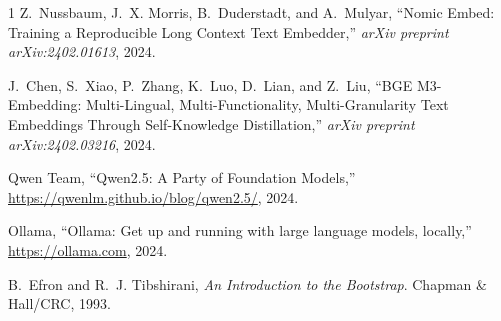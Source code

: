 \documentclass[journal]{IEEEtran}
\begin{document}
\begin{thebibliography}{1}
Z.~Nussbaum, J.~X. Morris, B.~Duderstadt, and A.~Mulyar,
``Nomic Embed: Training a Reproducible Long Context Text
Embedder,''
\emph{arXiv preprint arXiv:2402.01613}, 2024.

J.~Chen, S.~Xiao, P.~Zhang, K.~Luo, D.~Lian, and Z.~Liu,
``BGE M3-Embedding: Multi-Lingual, Multi-Functionality,
Multi-Granularity Text Embeddings Through Self-Knowledge
Distillation,''
\emph{arXiv preprint arXiv:2402.03216}, 2024.

Qwen Team,
``Qwen2.5: A Party of Foundation Models,''
\url{https://qwenlm.github.io/blog/qwen2.5/}, 2024.

Ollama,
``Ollama: Get up and running with large language models, locally,''
\url{https://ollama.com}, 2024.

B.~Efron and R.~J. Tibshirani,
\emph{An Introduction to the Bootstrap}.
Chapman \& Hall/CRC, 1993.

\end{thebibliography}
\end{document}
